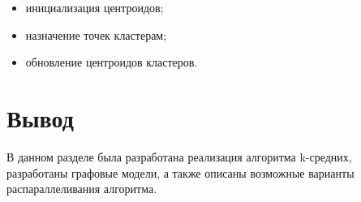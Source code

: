 \begin{itemize}
	\item инициализация центроидов;
	\item назначение точек кластерам;
	\item обновление центроидов кластеров.
\end{itemize}

\section*{Вывод}

В данном разделе была разработана реализация алгоритма k-средних, разработаны графовые модели, а также описаны возможные варианты распараллеливания алгоритма.
